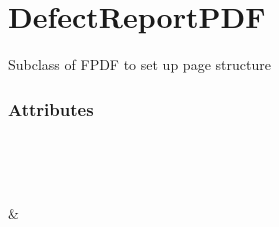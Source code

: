 \documentclass[letterpaper,10pt,english]{sphinxmanual}
\begin{document}
\section{DefectReportPDF}
\label{\detokenize{generated/quality_assessment.quality_pdf_report.DefectReportPDF:defectreportpdf}}\label{\detokenize{generated/quality_assessment.quality_pdf_report.DefectReportPDF::doc}}

\begin{fulllineitems}
\label{\detokenize{generated/quality_assessment.quality_pdf_report.DefectReportPDF:quality_assessment.quality_pdf_report.DefectReportPDF}}
\sphinxAtStartPar
Subclass of FPDF to set up page structure
\subsubsection*{Attributes}


\begin{savenotes}\sphinxatlongtablestart\begin{longtable}[c]{}
\hline

\endfirsthead

%
{}\\
\hline

\endhead

\hline
{}\\
\endfoot

\endlastfoot

\sphinxAtStartPar
{\hyperref[\detokenize{generated/quality_assessment.quality_pdf_report.DefectReportPDF.MARKDOWN_BOLD_MARKER:quality_assessment.quality_pdf_report.DefectReportPDF.MARKDOWN_BOLD_MARKER}]{}}
&
\sphinxAtStartPar


\end{longtable}
\end{savenotes}
\end{fulllineitems}
\end{document}

